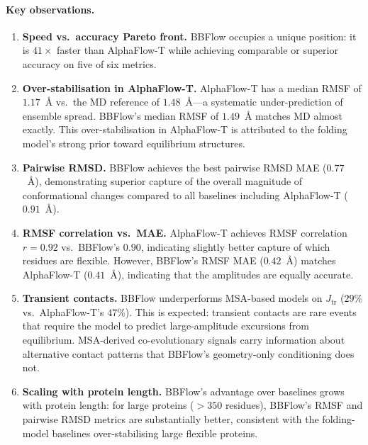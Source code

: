 \documentclass[12pt,a4paper]{article}
\begin{document}
\paragraph{Key observations.}
\begin{enumerate}
  \item \textbf{Speed vs.\ accuracy Pareto front.}
    BBFlow occupies a unique position: it is $41\times$ faster than AlphaFlow-T while
    achieving comparable or superior accuracy on five of six metrics.

  \item \textbf{Over-stabilisation in AlphaFlow-T.}
    AlphaFlow-T has a median RMSF of $1.17$~Å vs.\ the MD reference of $1.48$~Å---a
    systematic under-prediction of ensemble spread.  BBFlow's median RMSF of $1.49$~Å
    matches MD almost exactly.  This over-stabilisation in AlphaFlow-T is attributed to the
    folding model's strong prior toward equilibrium structures.

  \item \textbf{Pairwise RMSD.}
    BBFlow achieves the best pairwise RMSD MAE ($0.77$~Å), demonstrating superior capture of
    the overall magnitude of conformational changes compared to all baselines including
    AlphaFlow-T ($0.91$~Å).

  \item \textbf{RMSF correlation vs.\ MAE.}
    AlphaFlow-T achieves RMSF correlation $r = 0.92$ vs.\ BBFlow's $0.90$, indicating
    slightly better capture of which residues are flexible.  However, BBFlow's RMSF MAE
    ($0.42$~Å) matches AlphaFlow-T ($0.41$~Å), indicating that the amplitudes are equally
    accurate.

  \item \textbf{Transient contacts.}
    BBFlow underperforms MSA-based models on $J_{\mathrm{tr}}$ ($29\%$ vs.\ AlphaFlow-T's
    $47\%$).  This is expected: transient contacts are rare events that require the model to
    predict large-amplitude excursions from equilibrium.  MSA-derived co-evolutionary signals
    carry information about alternative contact patterns that BBFlow's geometry-only conditioning
    does not.

  \item \textbf{Scaling with protein length.}
    BBFlow's advantage over baselines grows with protein length: for large proteins ($> 350$
    residues), BBFlow's RMSF and pairwise RMSD metrics are substantially better, consistent
    with the folding-model baselines over-stabilising large flexible proteins.
\end{enumerate}
\end{document}
